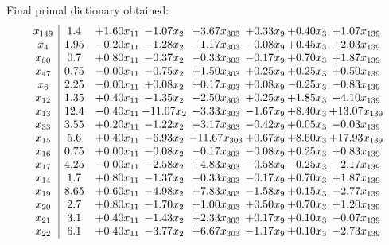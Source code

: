 \documentclass[8pt]{article}
\begin{document}
 Final primal dictionary obtained: 
\[\begin{array}{c| c c@{\hskip 2pt} c@{\hskip 2pt} c@{\hskip 2pt} c@{\hskip 2pt} c@{\hskip 2pt} c@{\hskip 2pt} }
 x_{149}   &  1.4 & +  1.60 x_{11} & -1.07 x_{2} & +  3.67 x_{303} & +  0.33 x_{9} & +  0.40 x_{3} & +  1.07 x_{139}\\
 x_{4}   &  1.95 & -0.20 x_{11} & -1.28 x_{2} & -1.17 x_{303} & -0.08 x_{9} & +  0.45 x_{3} & +  2.03 x_{139}\\
 x_{80}   &  0.7 & +  0.80 x_{11} & -0.37 x_{2} & -0.33 x_{303} & -0.17 x_{9} & +  0.70 x_{3} & +  1.87 x_{139}\\
 x_{47}   &  0.75 & -0.00 x_{11} & -0.75 x_{2} & +  1.50 x_{303} & +  0.25 x_{9} & +  0.25 x_{3} & +  0.50 x_{139}\\
 x_{6}   &  2.25 & -0.00 x_{11} & +  0.08 x_{2} & +  0.17 x_{303} & +  0.08 x_{9} & -0.25 x_{3} & -0.83 x_{139}\\
 x_{12}   &  1.35 & +  0.40 x_{11} & -1.35 x_{2} & -2.50 x_{303} & +  0.25 x_{9} & +  1.85 x_{3} & +  4.10 x_{139}\\
 x_{13}   &  12.4 & -0.40 x_{11} & -11.07 x_{2} & -3.33 x_{303} & -1.67 x_{9} & +  8.40 x_{3} & + 13.07 x_{139}\\
 x_{33}   &  3.55 & +  0.20 x_{11} & -1.22 x_{2} & +  3.17 x_{303} & -0.42 x_{9} & +  0.05 x_{3} & -0.03 x_{139}\\
 x_{15}   &  5.6 & +  0.40 x_{11} & -6.93 x_{2} & -11.67 x_{303} & +  0.67 x_{9} & +  8.60 x_{3} & + 17.93 x_{139}\\
 x_{16}   &  0.75 & +  0.00 x_{11} & -0.08 x_{2} & -0.17 x_{303} & -0.08 x_{9} & +  0.25 x_{3} & +  0.83 x_{139}\\
 x_{17}   &  4.25 & -0.00 x_{11} & -2.58 x_{2} & +  4.83 x_{303} & -0.58 x_{9} & -0.25 x_{3} & -2.17 x_{139}\\
 x_{14}   &  1.7 & +  0.80 x_{11} & -1.37 x_{2} & -0.33 x_{303} & -0.17 x_{9} & +  0.70 x_{3} & +  1.87 x_{139}\\
 x_{19}   &  8.65 & +  0.60 x_{11} & -4.98 x_{2} & +  7.83 x_{303} & -1.58 x_{9} & +  0.15 x_{3} & -2.77 x_{139}\\
 x_{20}   &  2.7 & +  0.80 x_{11} & -1.70 x_{2} & +  1.00 x_{303} & +  0.50 x_{9} & +  0.70 x_{3} & +  1.20 x_{139}\\
 x_{21}   &  3.1 & +  0.40 x_{11} & -1.43 x_{2} & +  2.33 x_{303} & +  0.17 x_{9} & +  0.10 x_{3} & -0.07 x_{139}\\
 x_{22}   &  6.1 & +  0.40 x_{11} & -3.77 x_{2} & +  6.67 x_{303} & -1.17 x_{9} & +  0.10 x_{3} & -2.73 x_{139}\\

\end{array}\]
\end{document}
